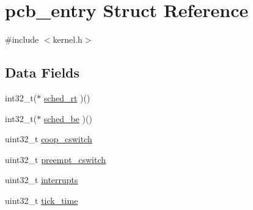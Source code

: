 \hypertarget{structpcb__entry}{\section{pcb\-\_\-entry Struct Reference}
\label{structpcb__entry}
}


{\ttfamily \#include $<$kernel.\-h$>$}

\subsection*{Data Fields}
\begin{DoxyCompactItemize}
\item 
int32\-\_\-t($\ast$ \hyperlink{structpcb__entry_ad3c7b06bf949312a542d036f92d2619a}{sched\-\_\-rt} )()
\item 
int32\-\_\-t($\ast$ \hyperlink{structpcb__entry_aaf3abd937873f1cfa6cea1f4921d5f7a}{sched\-\_\-be} )()
\item 
uint32\-\_\-t \hyperlink{structpcb__entry_ac5899befd89fa0e8b2aeceed85e01415}{coop\-\_\-cswitch}
\item 
uint32\-\_\-t \hyperlink{structpcb__entry_af49c7195c79f5de2d70825e2252c8d77}{preempt\-\_\-cswitch}
\item 
uint32\-\_\-t \hyperlink{structpcb__entry_ae5474e1d477335caf5515d8a940d1f77}{interrupts}
\item 
uint32\-\_\-t \hyperlink{structpcb__entry_a998d1bf7b5ac3d6b0b9c4c6c7a0ebec6}{tick\-\_\-time}
\end{DoxyCompactItemize}


